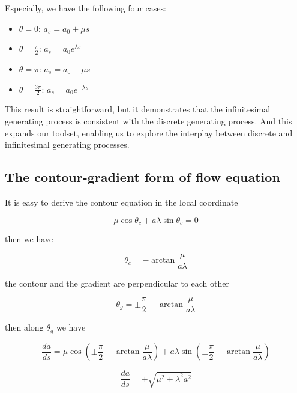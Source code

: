 Especially, we have the following four cases:
\begin{itemize}
\item $\theta = 0$: $a_s = a_0 + \mu s$
\item $\theta = \frac{\pi}{2}$: $a_s = a_0 e^{\lambda s}$
\item $\theta = \pi$: $a_s = a_0 - \mu s$
\item $\theta = \frac{3 \pi}{2}$: $a_s = a_0 e^{- \lambda s} $
\end{itemize}

This result is straightforward, but it demonstrates that the infinitesimal generating process is consistent with the discrete generating process.
And this expands our toolset, enabling us to explore the interplay between discrete and infinitesimal generating processes.

\subsection{The contour-gradient form of flow equation}\label{subsec:the-contour-gradient-form}

It is easy to derive the contour equation in the local coordinate

\begin{equation}
    \mu \cos \theta_c + a \lambda \sin \theta_c = 0\label{eq:contour}
\end{equation}

then we have

\begin{equation}
    \theta_c = - \arctan \frac{\mu}{a \lambda}\label{eq:contourangle}
\end{equation}

the contour and the gradient are perpendicular to each other

\begin{equation}
    \theta_g = \pm \frac{\pi}{2} - \arctan \frac{\mu}{a \lambda}\label{eq:gradientangle}
\end{equation}

then along $\theta_g$ we have

\begin{equation}
    \frac{da}{ds} = \mu \cos (\pm \frac{\pi}{2} - \arctan \frac{\mu}{a \lambda}) + a \lambda \sin (\pm \frac{\pi}{2} - \arctan \frac{\mu}{a \lambda})
    \label{eq:alonggradient}
\end{equation}

\begin{equation}
    \frac{da}{ds} = \pm \sqrt{\mu^2 + \lambda^2 a^2}\label{eq:grad}
\end{equation}

